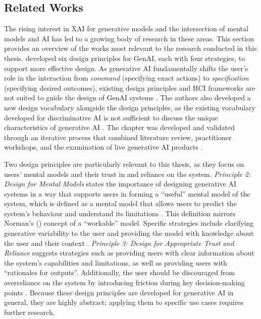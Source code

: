 \subsection{Related Works} \label{ssec:related-works}

The rising interest in \ac{XAI} for generative models and the intersection of mental models and \ac{AI} has led to a growing body of research in these areas. This section provides an overview of the works most relevant to the research conducted in this thesis. \textcite{Weisz2025} developed six design principles for \ac{GenAI}, each with four strategies, to support more effective design. As generative \ac{AI} fundamentally shifts the user's role in the interaction from \textit{command} (specifying exact actions) to \textit{specification} (specifying desired outcomes), existing design principles and \ac{HCI} frameworks are not suited to guide the design of \ac{GenAI} systems \parencite{Weisz2025}. The authors also developed a new design vocabulary alongside the design principles, as the existing vocabulary developed for discriminative \ac{AI} is not sufficient to discuss the unique characteristics of generative \ac{AI} \parencite{Weisz2025}. The chapter was developed and validated through an iterative process that combined literature review, practitioner workshops, and the examination of live generative AI products \parencite{Weisz2025}.

Two design principles are particularly relevant to this thesis, as they focus on users' mental models and their trust in and reliance on the system. \textit{Principle 2: Design for Mental Models} states the importance of designing generative \ac{AI} systems in a way that supports users in forming a \enquote{useful} mental model of the system, which is defined as a mental model that allows users to predict the system's behaviour and understand its limitations \parencite{Weisz2025}. This definition mirrors Norman's (\citeyear{Norman1983}) concept of a \enquote{workable} model. Specific strategies include clarifying generative variability to the user and providing the model with knowledge about the user and their context \parencite{Weisz2025}. \textit{Principle 3: Design for Appropriate Trust and Reliance} suggests strategies such as providing users with clear information about the system's capabilities and limitations, as well as providing users with \enquote{rationales for outputs}. Additionally, the user should be discouraged from overreliance on the system by introducing friction during key decision-making points \parencite{Weisz2025}. Because these design principles are developed for generative \ac{AI} in general, they are highly abstract; applying them to specific use cases requires further research.

